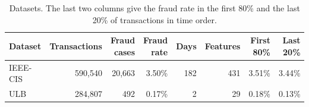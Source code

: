 \begin{table}[htbp]
\caption{Datasets. The last two columns give the fraud rate in the first 80\% and the last 20\% of transactions in time order.}
\label{tab:data}
\small
\begin{tabular}{lrrrrrrr}
\toprule
Dataset & Transactions & Fraud cases & Fraud rate & Days & Features & First 80\% & Last 20\% \\
\midrule
IEEE-CIS & 590,540 & 20,663 & 3.50\% & 182 & 431 & 3.51\% & 3.44\% \\
ULB & 284,807 & 492 & 0.17\% & 2 & 29 & 0.18\% & 0.13\% \\
\bottomrule
\end{tabular}
\end{table}
